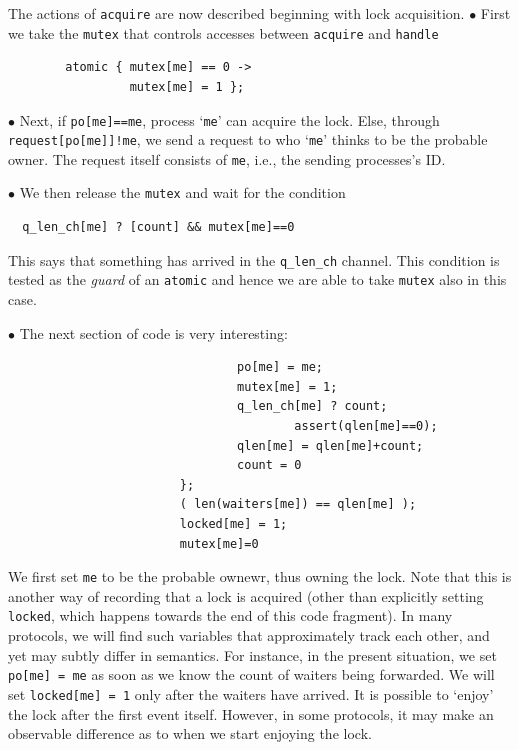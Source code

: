 \documentclass[11pt]{article}
\begin{document}
The actions of {\tt acquire} are now described beginning with
lock acquisition.
%
\noindent$\bullet$
First we take the {\tt mutex} that controls accesses
between {\tt acquire} and {\tt handle}
\begin{small}
\begin{verbatim}
        atomic { mutex[me] == 0 ->  
                 mutex[me] = 1 };
\end{verbatim}
\end{small}

\noindent$\bullet$
Next, if {\tt po[me]==me}, process `{\tt me}' can acquire the lock.
Else, through {\tt request[po[me]]!me}, we send a request to
who `{\tt me}' thinks to be the probable owner.
%
The request itself consists of {\tt me}, i.e., the sending processes's ID.

\noindent$\bullet$
We then release the {\tt mutex} and wait for the condition
%
\begin{small}
\begin{verbatim}
  q_len_ch[me] ? [count] && mutex[me]==0
\end{verbatim}
\end{small}
%
This says that something has arrived in the {\tt q\_len\_ch} channel.
%
This condition is tested as the {\em guard} of an {\tt atomic}
and hence  we are able to take {\tt mutex} also in this case.

\noindent$\bullet$
The next section of code is very interesting:
%
\begin{small}
\begin{verbatim}
                                po[me] = me;
                                mutex[me] = 1;
                                q_len_ch[me] ? count;
                                        assert(qlen[me]==0);
                                qlen[me] = qlen[me]+count;
                                count = 0
                        };
                        ( len(waiters[me]) == qlen[me] );
                        locked[me] = 1;
                        mutex[me]=0
\end{verbatim}
\end{small}
We first set {\tt me} to be the probable ownewr, thus owning the lock.
Note that this is another way of recording that a lock is acquired
(other than explicitly setting {\tt locked}, which happens towards
the end of this code fragment).
%
In many protocols, we will find such variables that approximately
track each other, and yet may subtly differ in semantics.
%
For instance, in the present situation, we set {\tt po[me] = me}
as soon as we know the count of waiters being forwarded.
%
We will set {\tt locked[me] = 1} only after the waiters have arrived.
%
It is possible to `enjoy' the lock after the first event itself.
%
However, in some protocols, it may make an observable difference as
to when we start enjoying the lock.
\end{document}
